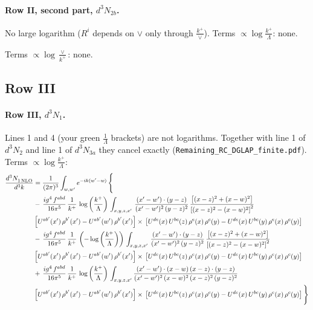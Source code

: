 \documentclass[10pt]{article}
\numberwithin{equation}{section}
\begin{document}
\paragraph{Row II, second part, $d^3N_{2b}$.}
No large logarithm ($R^i$ depends on $\vee$ only through $\frac{k^+}{\vee}$).
\noindent Terms $\propto\log\frac{k^+}{\Lambda}$: none.

\noindent Terms $\propto\log\frac{\vee}{k^+}$: none.

\subsection{Row III}
\paragraph{Row III, $d^3N_1$.}
Lines 1 and 4 (your green $\frac{1}{\Lambda}$ brackets) are not logarithms. Together with line 1 of $d^3N_2$ and line 1 of $d^3N_{3a}$ they cancel exactly (\texttt{Remaining\_RC\_DGLAP\_finite.pdf}).
\noindent Terms $\propto\log\frac{k^+}{\Lambda}$:
\begin{align}
   \frac{d^{3}N_{1\,\rm NLO}^{\rm}}{d^{3}k}  & =  \frac{1}{(2\pi)^{3}}  \int_{w, w^\prime} e^{-ik(w^\prime-w)}\, \Bigg\{\notag \\
& -\,\frac{ig^{4}\,f^{abd}}{16\pi^{5}}\,\frac{1}{k^{+}}\,\log{\left(\frac{k^{+}}{\Lambda}\right)}\,\int_{x,y,z,x'}\, \frac{(x'-w')\cdot (y-z)}{(x'-w')^{2}\,(y-z)^{2}}\,\frac{\left[(x-z)^{2}+(x-w)^{2}\right]}{\left[(x-z)^{2}-(x-w)^{2}\right]^{2}}\notag \\ & \left[U^{ab'}(x')\,\rho^{b'}(x')-U^{ab'}(w')\, \rho^{b'}(x')\right]\times\, \left[U^{de}(x)\,U^{bc}(z)\, \rho^{e}(x)\,\rho^{c}(y)-U^{de}(x)\,U^{bc}(y)\,\rho^{e}(x)\,\rho^{c}(y)\right] \notag \\
& -\,\frac{ig^{4}\,f^{abd}}{16\pi^{5}}\,\frac{1}{k^{+}}\,\left(-\log{\left(\frac{k^{+}}{\Lambda}\right)}\right)\,\int_{x,y,z,x'}\, \frac{(x'-w')\cdot (y-z)}{(x'-w')^{2}\,(y-z)^{2}}\,\frac{\left[(x-z)^{2}+(x-w)^{2}\right]}{\left[(x-z)^{2}-(x-w)^{2}\right]^{2}}\notag \\ & \left[U^{ab'}(x')\,\rho^{b'}(x')-U^{ab'}(w')\, \rho^{b'}(x')\right]\times\, \left[U^{de}(x)\,U^{bc}(z)\, \rho^{e}(x)\,\rho^{c}(y)-U^{de}(x)\,U^{bc}(y)\,\rho^{e}(x)\,\rho^{c}(y)\right] \notag \\
& +\, \frac{ig^{4}\,f^{abd}}{16\pi^{5}}\,\frac{1}{k^{+}}\,\log{\left(\frac{k^{+}}{\Lambda}\right)}\,\int_{x,y,z,x'} \frac{(x'-w')\cdot (x-w)\, (x-z)\cdot (y-z)}{(x'-w')^{2}\, (x-w)^{2}\, (x-z)^{2}\, (y-z)^{2}}\, \notag \\ & \left[U^{ab'}(x')\,\rho^{b'}(x')-U^{ab'}(w')\, \rho^{b'}(x')\right]\times\, \left[U^{de}(x)\,U^{bc}(z)\, \rho^{e}(x)\,\rho^{c}(y)-U^{de}(x)\,U^{bc}(y)\,\rho^{e}(x)\,\rho^{c}(y)\right]\Bigg\} \label{eq:J:G1IIIN1}
\end{align}
\end{document}
